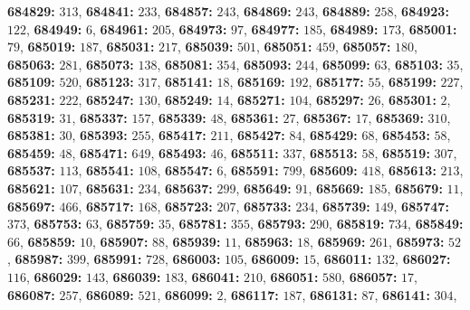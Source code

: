 \textsf{\bfseries 684829:} $313$, \textsf{\bfseries 684841:} $233$, \textsf{\bfseries 684857:} $243$, \textsf{\bfseries 684869:} $243$, \textsf{\bfseries 684889:} $258$, \textsf{\bfseries 684923:} $122$, \textsf{\bfseries 684949:} $6$, \textsf{\bfseries 684961:} $205$, \textsf{\bfseries 684973:} $97$, \textsf{\bfseries 684977:} $185$, \textsf{\bfseries 684989:} $173$, \textsf{\bfseries 685001:} $79$, \textsf{\bfseries 685019:} $187$, \textsf{\bfseries 685031:} $217$, \textsf{\bfseries 685039:} $501$, \textsf{\bfseries 685051:} $459$, \textsf{\bfseries 685057:} $180$, \textsf{\bfseries 685063:} $281$, \textsf{\bfseries 685073:} $138$, \textsf{\bfseries 685081:} $354$, \textsf{\bfseries 685093:} $244$, \textsf{\bfseries 685099:} $63$, \textsf{\bfseries 685103:} $35$, \textsf{\bfseries 685109:} $520$, \textsf{\bfseries 685123:} $317$, \textsf{\bfseries 685141:} $18$, \textsf{\bfseries 685169:} $192$, \textsf{\bfseries 685177:} $55$, \textsf{\bfseries 685199:} $227$, \textsf{\bfseries 685231:} $222$, \textsf{\bfseries 685247:} $130$, \textsf{\bfseries 685249:} $14$, \textsf{\bfseries 685271:} $104$, \textsf{\bfseries 685297:} $26$, \textsf{\bfseries 685301:} $2$, \textsf{\bfseries 685319:} $31$, \textsf{\bfseries 685337:} $157$, \textsf{\bfseries 685339:} $48$, \textsf{\bfseries 685361:} $27$, \textsf{\bfseries 685367:} $17$, \textsf{\bfseries 685369:} $310$, \textsf{\bfseries 685381:} $30$, \textsf{\bfseries 685393:} $255$, \textsf{\bfseries 685417:} $211$, \textsf{\bfseries 685427:} $84$, \textsf{\bfseries 685429:} $68$, \textsf{\bfseries 685453:} $58$, \textsf{\bfseries 685459:} $48$, \textsf{\bfseries 685471:} $649$, \textsf{\bfseries 685493:} $46$, \textsf{\bfseries 685511:} $337$, \textsf{\bfseries 685513:} $58$, \textsf{\bfseries 685519:} $307$, \textsf{\bfseries 685537:} $113$, \textsf{\bfseries 685541:} $108$, \textsf{\bfseries 685547:} $6$, \textsf{\bfseries 685591:} $799$, \textsf{\bfseries 685609:} $418$, \textsf{\bfseries 685613:} $213$, \textsf{\bfseries 685621:} $107$, \textsf{\bfseries 685631:} $234$, \textsf{\bfseries 685637:} $299$, \textsf{\bfseries 685649:} $91$, \textsf{\bfseries 685669:} $185$, \textsf{\bfseries 685679:} $11$, \textsf{\bfseries 685697:} $466$, \textsf{\bfseries 685717:} $168$, \textsf{\bfseries 685723:} $207$, \textsf{\bfseries 685733:} $234$, \textsf{\bfseries 685739:} $149$, \textsf{\bfseries 685747:} $373$, \textsf{\bfseries 685753:} $63$, \textsf{\bfseries 685759:} $35$, \textsf{\bfseries 685781:} $355$, \textsf{\bfseries 685793:} $290$, \textsf{\bfseries 685819:} $734$, \textsf{\bfseries 685849:} $66$, \textsf{\bfseries 685859:} $10$, \textsf{\bfseries 685907:} $88$, \textsf{\bfseries 685939:} $11$, \textsf{\bfseries 685963:} $18$, \textsf{\bfseries 685969:} $261$, \textsf{\bfseries 685973:} $52$, \textsf{\bfseries 685987:} $399$, \textsf{\bfseries 685991:} $728$, \textsf{\bfseries 686003:} $105$, \textsf{\bfseries 686009:} $15$, \textsf{\bfseries 686011:} $132$, \textsf{\bfseries 686027:} $116$, \textsf{\bfseries 686029:} $143$, \textsf{\bfseries 686039:} $183$, \textsf{\bfseries 686041:} $210$, \textsf{\bfseries 686051:} $580$, \textsf{\bfseries 686057:} $17$, \textsf{\bfseries 686087:} $257$, \textsf{\bfseries 686089:} $521$, \textsf{\bfseries 686099:} $2$, \textsf{\bfseries 686117:} $187$, \textsf{\bfseries 686131:} $87$, \textsf{\bfseries 686141:} $304$, 
